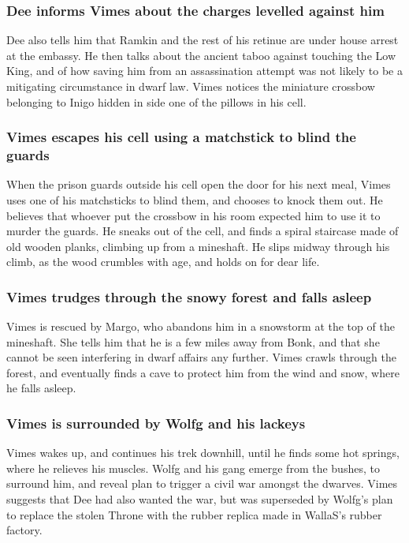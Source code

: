 \subsubsection{\Gls{Dee} informs \Gls{Vimes} about the charges levelled against him}
\Gls{Dee} also tells him that \Gls{Ramkin} and the rest of his retinue are under house arrest at
the embassy. He then talks about the ancient taboo against touching the Low King, and of how
saving him from an assassination attempt was not likely to be a mitigating circumstance in dwarf
law. \Gls{Vimes} notices the miniature crossbow belonging to \Gls{Inigo} hidden in side one of the
pillows in his cell.

\subsubsection{\Gls{Vimes} escapes his cell using a matchstick to blind the guards}
When the prison guards outside his cell open the door for his next meal, \Gls{Vimes} uses one of
his matchsticks to blind them, and chooses to knock them out. He believes that whoever put the
crossbow in his room expected him to use it to murder the guards. He sneaks out of the cell, and
finds a spiral staircase made of old wooden planks, climbing up from a mineshaft. He slips midway
through his climb, as the wood crumbles with age, and holds on for dear life.

\subsubsection{\Gls{Vimes} trudges through the snowy forest and falls asleep}
\Gls{Vimes} is rescued by \Gls{Margo}, who abandons him in a snowstorm at the top of the mineshaft.
She tells him that he is a few miles away from Bonk, and that she cannot be seen interfering in
dwarf affairs any further. \Gls{Vimes} crawls through the forest, and eventually finds a cave to
protect him from the wind and snow, where he falls asleep.

\subsubsection{\Gls{Vimes} is surrounded by \Gls{Wolfg} and his lackeys}
\Gls{Vimes} wakes up, and continues his trek downhill, until he finds some hot springs, where he
relieves his muscles. \Gls{Wolfg} and his gang emerge from the bushes, to surround him, and reveal
plan to trigger a civil war amongst the dwarves. \Gls{Vimes} suggests that \Gls{Dee} had also wanted
the war, but was superseded by \Gls{Wolfg}'s plan to replace the stolen Throne with the rubber
replica made in \Gls{WallaS}'s rubber factory.

